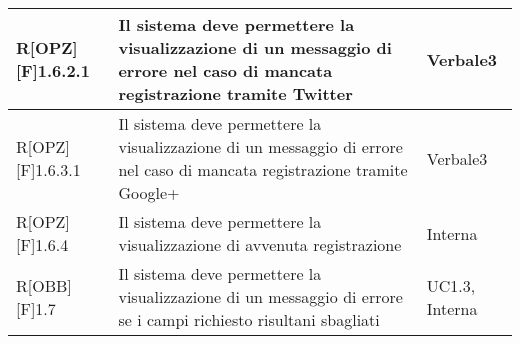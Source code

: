 \begin{table}[h]
\begin{tabular}{|p{}|p{}|p{}|}
R[OPZ][F]1.6.2.1 & Il sistema deve permettere la visualizzazione di un messaggio di errore nel caso di mancata registrazione tramite Twitter & Verbale3 \\ \midrule
R[OPZ][F]1.6.3.1 & Il sistema deve permettere la visualizzazione di un messaggio di errore nel caso di mancata registrazione tramite Google+ & Verbale3 \\ \midrule
R[OPZ][F]1.6.4 & Il sistema deve permettere la visualizzazione di avvenuta registrazione  & Interna \\ \midrule
R[OBB][F]1.7 & Il sistema deve permettere la visualizzazione di un messaggio di errore se i campi richiesto risultani sbagliati & UC1.3, Interna \\ \midrule

\end{tabular}
\end{table}
\newpage


